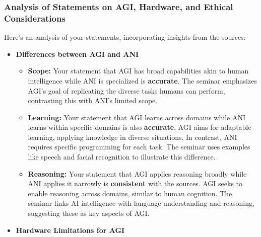 \documentclass[
]{article}
\author{}
\date{}
\begin{document}
\subsubsection{Analysis of Statements on AGI, Hardware, and Ethical
Considerations}\label{analysis-of-statements-on-agi-hardware-and-ethical-considerations}

Here's an analysis of your statements, incorporating insights from the
sources:

\begin{itemize}
\item
  \textbf{Differences between AGI and ANI}

  \begin{itemize}
  
  \item
    \textbf{Scope:} Your statement that AGI has broad capabilities akin
    to human intelligence while ANI is specialized is \textbf{accurate}.
    The seminar emphasizes AGI's goal of replicating the diverse tasks
    humans can perform, contrasting this with ANI's limited scope.
  \item
    \textbf{Learning:} Your statement that AGI learns across domains
    while ANI learns within specific domains is also \textbf{accurate}.
    AGI aims for adaptable learning, applying knowledge in diverse
    situations. In contrast, ANI requires specific programming for each
    task. The seminar uses examples like speech and facial recognition
    to illustrate this difference.
  \item
    \textbf{Reasoning:} Your statement that AGI applies reasoning
    broadly while ANI applies it narrowly is \textbf{consistent} with
    the sources. AGI seeks to enable reasoning across domains, similar
    to human cognition. The seminar links AI intelligence with language
    understanding and reasoning, suggesting these as key aspects of AGI.
  \end{itemize}
\item
  \textbf{Hardware Limitations for AGI}

  \begin{itemize}
  

\end{itemize}
\end{itemize}
\end{document}
